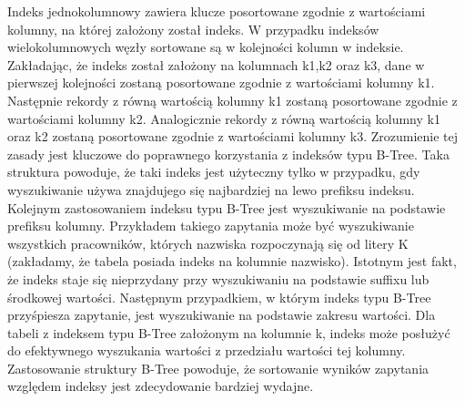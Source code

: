  
Indeks jednokolumnowy zawiera klucze posortowane zgodnie z wartościami kolumny, na której założony został indeks. W przypadku indeksów wielokolumnowych węzły sortowane są w kolejności kolumn w indeksie. Zakładając, że indeks został założony na kolumnach k1,k2 oraz k3, dane w pierwszej kolejności zostaną posortowane zgodnie z wartościami kolumny k1. Następnie rekordy z równą wartością kolumny k1 zostaną posortowane zgodnie z wartościami kolumny k2. Analogicznie rekordy z równą wartością kolumny k1 oraz k2 zostaną posortowane zgodnie z wartościami kolumny k3. Zrozumienie tej zasady jest kluczowe do poprawnego korzystania z indeksów typu B-Tree. Taka struktura powoduje, że taki indeks jest użyteczny tylko w przypadku, gdy wyszukiwanie używa znajdujego się najbardziej na lewo prefiksu indeksu.
Kolejnym zastosowaniem indeksu typu B-Tree jest wyszukiwanie na podstawie prefiksu kolumny. Przykładem takiego zapytania może być wyszukiwanie wszystkich pracowników, których nazwiska rozpoczynają się od litery K (zakładamy, że tabela posiada indeks na kolumnie nazwisko). Istotnym jest fakt, że indeks staje się nieprzydany przy wyszukiwaniu na podstawie suffixu lub środkowej wartości. Następnym przypadkiem, w którym indeks typu B-Tree przyśpiesza zapytanie, jest wyszukiwanie na podstawie zakresu wartości. Dla tabeli z indeksem typu B-Tree założonym na kolumnie k, indeks może posłużyć do efektywnego wyszukania wartości z przedziału wartości tej kolumny. Zastosowanie struktury B-Tree powoduje, że sortowanie wyników zapytania względem indeksy jest zdecydowanie bardziej wydajne.
